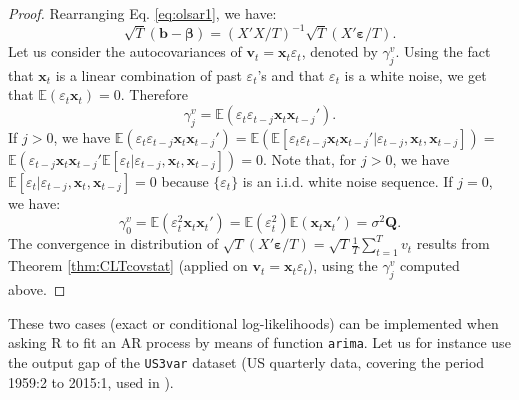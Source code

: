 \documentclass[
  12pt,
]{book}
\newenvironment{Shaded}{\begin{snugshade}}{\end{snugshade}}
\newcommand{\AttributeTok}[1]{\textcolor[rgb]{0.77,0.63,0.00}{#1}}
\newcommand{\DecValTok}[1]{\textcolor[rgb]{0.00,0.00,0.81}{#1}}
\newcommand{\FunctionTok}[1]{\textcolor[rgb]{0.00,0.00,0.00}{#1}}
\newcommand{\NormalTok}[1]{#1}
\newcommand{\OtherTok}[1]{\textcolor[rgb]{0.56,0.35,0.01}{#1}}
\newcommand{\SpecialCharTok}[1]{\textcolor[rgb]{0.00,0.00,0.00}{#1}}
\newcommand{\StringTok}[1]{\textcolor[rgb]{0.31,0.60,0.02}{#1}}
\theoremstyle{definition}
\theoremstyle{definition}
\theoremstyle{definition}
\theoremstyle{definition}
\theoremstyle{remark}
\begin{document}
\begin{proof}
Rearranging Eq. \eqref{eq:olsar1}, we have:
\[
\sqrt{T}(\mathbf{b}-\boldsymbol{\beta}) =  (X'X/T)^{-1}\sqrt{T}(X'\boldsymbol\varepsilon/T).
\]
Let us consider the autocovariances of \(\mathbf{v}_t = \mathbf{x}_t \varepsilon_t\), denoted by \(\gamma^v_j\). Using the fact that \(\mathbf{x}_t\) is a linear combination of past \(\varepsilon_t\)'s and that \(\varepsilon_t\) is a white noise, we get that \(\mathbb{E}(\varepsilon_t\mathbf{x}_t)=0\). Therefore
\[
\gamma^v_j = \mathbb{E}(\varepsilon_t\varepsilon_{t-j}\mathbf{x}_t\mathbf{x}_{t-j}').
\]
If \(j>0\), we have \(\mathbb{E}(\varepsilon_t\varepsilon_{t-j}\mathbf{x}_t\mathbf{x}_{t-j}')=\mathbb{E}(\mathbb{E}[\varepsilon_t\varepsilon_{t-j}\mathbf{x}_t\mathbf{x}_{t-j}'|\varepsilon_{t-j},\mathbf{x}_t,\mathbf{x}_{t-j}])=\) \(\mathbb{E}(\varepsilon_{t-j}\mathbf{x}_t\mathbf{x}_{t-j}'\mathbb{E}[\varepsilon_t|\varepsilon_{t-j},\mathbf{x}_t,\mathbf{x}_{t-j}])=0\). Note that, for \(j>0\), we have \(\mathbb{E}[\varepsilon_t|\varepsilon_{t-j},\mathbf{x}_t,\mathbf{x}_{t-j}]=0\) because \(\{\varepsilon_t\}\) is an i.i.d. white noise sequence. If \(j=0\), we have:
\[
\gamma^v_0 = \mathbb{E}(\varepsilon_t^2\mathbf{x}_t\mathbf{x}_{t}')= \mathbb{E}(\varepsilon_t^2) \mathbb{E}(\mathbf{x}_t\mathbf{x}_{t}')=\sigma^2\mathbf{Q}.
\]
The convergence in distribution of \(\sqrt{T}(X'\boldsymbol\varepsilon/T)=\sqrt{T}\frac{1}{T}\sum_{t=1}^Tv_t\) results from Theorem \ref{thm:CLTcovstat} (applied on \(\mathbf{v}_t=\mathbf{x}_t\varepsilon_t\)), using the \(\gamma_j^v\) computed above.
\end{proof}

These two cases (exact or conditional log-likelihoods) can be implemented when asking R to fit an AR process by means of function \texttt{arima}. Let us for instance use the output gap of the \texttt{US3var} dataset (US quarterly data, covering the period 1959:2 to 2015:1, used in \citet{Gourieroux_Monfort_Renne_2017}).

\begin{Shaded}
\end{Shaded}
\end{document}
